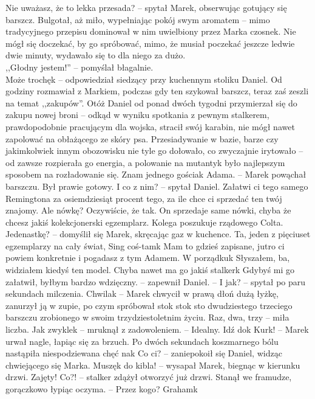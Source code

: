 \documentclass[../MAIN.tex]{subfiles}
\begin{document}
\sx Nie uważasz, że to lekka przesada? -- spytał Marek, obserwując gotujący się barszcz.
\qd
Bulgotał, aż miło, wypełniając pokój swym aromatem -- mimo tradycyjnego przepisu dominował w nim uwielbiony przez Marka czosnek. Nie mógł się doczekać, by go spróbować, mimo, że musiał poczekać jeszcze ledwie dwie minuty, wydawało się to dla niego za dużo.\\
,,Głodny jestem!'' -- pomyślał błagalnie.\\
\sx Może trochę\3k -- odpowiedział siedzący przy kuchennym stoliku Daniel.
\qd
Od godziny rozmawiał z Markiem, podczas gdy ten szykował barszcz, teraz zaś zeszli na temat ,,zakupów''. Otóż Daniel od ponad dwóch tygodni przymierzał się do zakupu nowej broni -- odkąd w wyniku spotkania z pewnym stalkerem, prawdopodobnie pracującym dla wojska, stracił swój karabin, nie mógł nawet zapolować na obłażącego ze skóry psa. Przesiadywanie w bazie, barze czy jakimkolwiek innym obozowisku nie tyle go dołowało, co zwyczajnie irytowało -- od zawsze rozpierała go energia, a polowanie na mutanty\3k było najlepszym sposobem na rozładowanie się.
\sx Znam jednego gościa\3k Adama. -- Marek powąchał barszczu. Był prawie gotowy.
\xx I co z nim? -- spytał Daniel.
\xx Załatwi ci tego samego Remingtona za osiemdziesiąt procent tego, za ile chce ci sprzedać ten twój znajomy.
\xx Ale nówkę?
\xx Oczywiście, że tak. On sprzedaje same nówki, chyba że chcesz jakiś kolekcjonerski egzemplarz.
\xx Kolega poszukuje rządowego Colta.
\xx Jedenastkę? -- domyślił się Marek, skręcając gaz w kuchence.
\xx Ta, jeden z pięciuset egzemplarzy na cały świat, Sing coś-tam\3k Mam to gdzieś zapisane, jutro ci powiem konkretnie i pogadasz z tym Adamem.
\xx W porządku\3k
\xx Słyszałem, ba, widziałem kiedyś ten model. Chyba nawet ma go jakiś stalker\3k
\xx Gdybyś mi go załatwił, byłbym bardzo wdzięczny. -- zapewnił Daniel. -- I jak? -- spytał po paru sekundach milczenia.
\xx Chwila\3k -- Marek chwycił w prawą dłoń dużą łyżkę, zanurzył ją w zupie, po czym spróbował sto\3k sto\3k sto dwudziestego trzeciego barszczu zrobionego w swoim trzydziestoletnim życiu. Raz, dwa, trzy -- miła liczba.
\xx Jak zwykle\3k -- mruknął z zadowoleniem. -- Idealny. Idź do\3k Kur\3k! -- Marek urwał nagle, łapiąc się za brzuch. Po dwóch sekundach koszmarnego bólu nastąpiła niespodziewana chęć na\3k
\xx Co ci? -- zaniepokoił się Daniel, widząc chwiejącego się Marka.
\xx Muszę\3k do kibla! -- wysapał Marek, biegnąc w kierunku drzwi.
\xx Zajęty!
\xx Co?! -- stalker zdążył otworzyć już drzwi. Stanął we framudze, gorączkowo łypiąc oczyma. -- Przez kogo?
\xx Graham\3k
\end{document}
